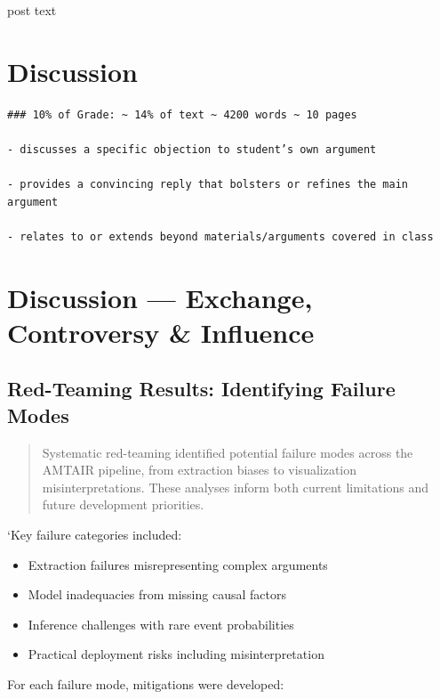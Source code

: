 \documentclass[]{book}
\providecommand{\tightlist}{%
  \setlength{\itemsep}{0pt}\setlength{\parskip}{0pt}}
\begin{document}
post text


\chapter{Discussion}\label{discussion}

\begin{verbatim}
### 10% of Grade: ~ 14% of text ~ 4200 words ~ 10 pages

- discusses a specific objection to student’s own argument

- provides a convincing reply that bolsters or refines the main argument

- relates to or extends beyond materials/arguments covered in class
\end{verbatim}


\chapter{Discussion --- Exchange, Controversy \&
Influence}\label{sec-discussion}

\section{Red-Teaming Results: Identifying Failure
Modes}\label{sec-red-teaming}

\begin{quote}
Systematic red-teaming identified potential failure modes across the
AMTAIR pipeline, from extraction biases to visualization
misinterpretations. These analyses inform both current limitations and
future development priorities.
\end{quote}

`Key failure categories included:

\begin{itemize}
\tightlist
\item
  Extraction failures misrepresenting complex arguments
\item
  Model inadequacies from missing causal factors
\item
  Inference challenges with rare event probabilities
\item
  Practical deployment risks including misinterpretation
\end{itemize}

For each failure mode, mitigations were developed:
\end{document}
